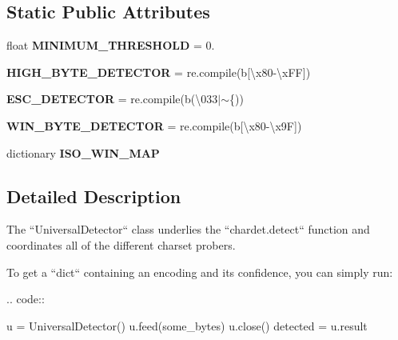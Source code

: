 \subsection*{Static Public Attributes}
\begin{DoxyCompactItemize}
\item 
\mbox{\label{classchardet_1_1universaldetector_1_1_universal_detector_a5d8319314b61ff7dbf18a3264e07b170}} 
float {\bfseries M\+I\+N\+I\+M\+U\+M\+\_\+\+T\+H\+R\+E\+S\+H\+O\+LD} = 0.
\item 
\mbox{\label{classchardet_1_1universaldetector_1_1_universal_detector_afab402b836d993f85a0859cf2fa7865a}} 
{\bfseries H\+I\+G\+H\+\_\+\+B\+Y\+T\+E\+\_\+\+D\+E\+T\+E\+C\+T\+OR} = re.\+compile(b\textquotesingle{}\mbox{[}\textbackslash{}x80-\/\textbackslash{}x\+FF\mbox{]}\textquotesingle{})
\item 
\mbox{\label{classchardet_1_1universaldetector_1_1_universal_detector_a0c20dd687b375833228853d93cb190d7}} 
{\bfseries E\+S\+C\+\_\+\+D\+E\+T\+E\+C\+T\+OR} = re.\+compile(b\textquotesingle{}(\textbackslash{}033$\vert$$\sim$\{)\textquotesingle{})
\item 
\mbox{\label{classchardet_1_1universaldetector_1_1_universal_detector_a96ace3fd0ad44466ed2418d22048bc3f}} 
{\bfseries W\+I\+N\+\_\+\+B\+Y\+T\+E\+\_\+\+D\+E\+T\+E\+C\+T\+OR} = re.\+compile(b\textquotesingle{}\mbox{[}\textbackslash{}x80-\/\textbackslash{}x9F\mbox{]}\textquotesingle{})
\item 
dictionary {\bfseries I\+S\+O\+\_\+\+W\+I\+N\+\_\+\+M\+AP}
\end{DoxyCompactItemize}


\subsection{Detailed Description}
\begin{DoxyVerb}The ``UniversalDetector`` class underlies the ``chardet.detect`` function
and coordinates all of the different charset probers.

To get a ``dict`` containing an encoding and its confidence, you can simply
run:

.. code::

        u = UniversalDetector()
        u.feed(some_bytes)
        u.close()
        detected = u.result\end{DoxyVerb}
 

